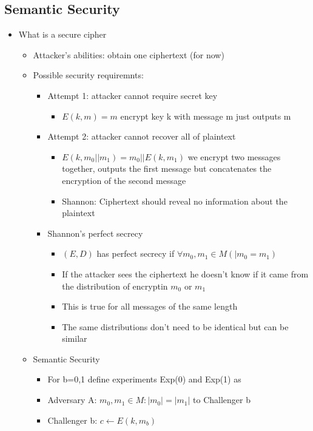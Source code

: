 \documentclass[]{article}
\begin{document}
\subsection{Semantic Security}
\begin{itemize}
	\item What is a secure cipher
	\begin{itemize}
		\item Attacker's abilities: obtain one ciphertext (for now)
		\item Possible security requiremnts:
		\begin{itemize}
			\item Attempt 1: attacker cannot require secret key
			\begin{itemize}
				\item $E(k,m) = m$ encrypt key k with message m just outputs m
			\end{itemize}
			\item Attempt 2: attacker cannot recover all of plaintext
			\begin{itemize}
				\item $E(k, m_{0} || m_{1}) = m_{0} || E(k,m_{1})$ we encrypt two messages together, outputs the first message but concatenates the encryption of the second message
				\item Shannon: Ciphertext should reveal no information about the plaintext
			\end{itemize}
			\item Shannon's perfect secrecy
			\begin{itemize}
				\item $(E,D)$ has perfect secrecy if $\forall m_{0}, m_{1} \in M (|m_{0} = m_{1})$
				\item If the attacker sees the ciphertext he doesn't know if it came from the distribution of encryptin $m_{0}$ or $m_{1}$
				\item This is true for all messages of the same length
				\item The same distributions don't need to be identical but can be similar
			\end{itemize}
		\end{itemize}
		\item Semantic Security
		\begin{itemize}
			\item For b=0,1 define experiments Exp(0) and Exp(1) as
			\item Adversary A: $m_{0}, m_{1} \in M: |m_{0}| = |m_{1}|$ to Challenger b
			\item Challenger b: $c \leftarrow E(k, m_{b})$

\end{itemize}
\end{itemize}
\end{itemize}
\end{document}
